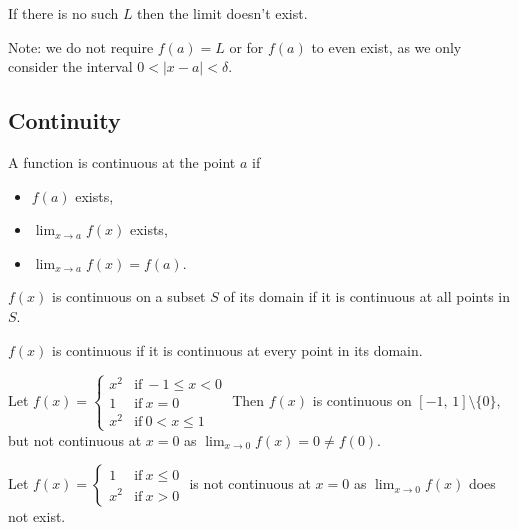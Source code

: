 \documentclass[10pt, a4paper]{article}
\begin{document}
If there is no such $L$ then the limit doesn't exist.

Note: we do not require $f(a) = L$ or for $f(a)$ to even exist, as we only consider the interval $0 < |x - a| < \delta$.

\subsection{Continuity}

\begin{definition}
    A function is continuous at the point $a$ if
    \begin{itemize}
        \item $f(a)$ exists,
        \item $\lim_{x \rightarrow a}f(x)$ exists,
        \item $\lim_{x \rightarrow a}f(x) = f(a)$.
    \end{itemize}
\end{definition}

\begin{definition}
    $f(x)$ is continuous on a subset $S$ of its domain if it is continuous at all points in $S$.
\end{definition}

\begin{definition}
    $f(x)$ is continuous if it is continuous at every point in its domain.
\end{definition}

\begin{example}
    Let $f(x) = \begin{cases}
        x ^ 2 &\text{if}\  -1\leq x < 0 \\
        1 &\text{if}\  x = 0 \\
        x ^ 2 &\text{if}\  0 < x \leq 1 
    \end{cases}$
    Then $f(x)$ is continuous on $[-1,\, 1] \setminus \{0\}$, but not continuous at $x = 0$ as $\displaystyle\lim_{x \rightarrow 0}f(x) = 0 \neq f(0)$.
\end{example}

\begin{example}
    Let $f(x) = \begin{cases}
        1 &\text{if}\  x \leq 0 \\
        x ^ 2 &\text{if}\  x > 0
    \end{cases}$
    is not continuous at $x = 0$ as $\displaystyle\lim_{x \rightarrow 0}f(x)$ does not exist.
\end{example}
\end{document}
